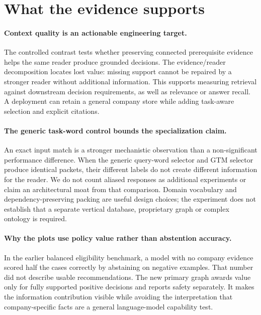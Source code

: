 \section{What the evidence supports}
\paragraph{Context quality is an actionable engineering target.}
The controlled contrast tests whether preserving connected prerequisite evidence helps the same reader produce grounded decisions. The evidence/reader decomposition locates lost value: missing support cannot be repaired by a stronger reader without additional information. This supports measuring retrieval against downstream decision requirements, as well as relevance or answer recall. A deployment can retain a general company store while adding task-aware selection and explicit citations.

\paragraph{The generic task-word control bounds the specialization claim.}
An exact input match is a stronger mechanistic observation than a non-significant performance difference. When the generic query-word selector and GTM selector produce identical packets, their different labels do not create different information for the reader. We do not count aliased responses as additional experiments or claim an architectural moat from that comparison. Domain vocabulary and dependency-preserving packing are useful design choices; the experiment does not establish that a separate vertical database, proprietary graph or complex ontology is required.

\paragraph{Why the plots use policy value rather than abstention accuracy.}
In the earlier balanced eligibility benchmark, a model with no company evidence scored half the cases correctly by abstaining on negative examples. That number did not describe usable recommendations. The new primary graph awards value only for fully supported positive decisions and reports safety separately. It makes the information contribution visible while avoiding the interpretation that company-specific facts are a general language-model capability test.

